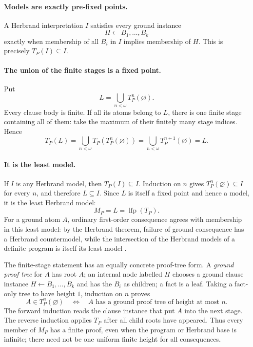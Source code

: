 \paragraph{Models are exactly pre-fixed points.}
A Herbrand interpretation \(I\) satisfies every ground instance
\[
 H\leftarrow B_1,\ldots,B_k
\]
exactly when membership of all \(B_i\) in \(I\) implies membership of \(H\).
This is precisely \(T_P(I)\subseteq I\).

\paragraph{The union of the finite stages is a fixed point.}
Put
\[
 L=\bigcup_{n<\omega}T_P^n(\varnothing).
\]
Every clause body is finite.  If all its atoms belong to \(L\), there is one
finite stage containing all of them: take the maximum of their finitely many
stage indices.  Hence
\[
 T_P(L)
 =\bigcup_{n<\omega}T_P(T_P^n(\varnothing))
 =\bigcup_{n<\omega}T_P^{n+1}(\varnothing)
 =L.
\]

\paragraph{It is the least model.}
If \(I\) is any Herbrand model, then \(T_P(I)\subseteq I\).  Induction on \(n\)
gives \(T_P^n(\varnothing)\subseteq I\) for every \(n\), and therefore
\(L\subseteq I\).  Since \(L\) is itself a fixed point and hence a model, it is
the least Herbrand model:
\[
 M_P=L=\operatorname{lfp}(T_P).
\]
For a ground atom \(A\), ordinary first-order consequence agrees with
membership in this least model: by the Herbrand theorem, failure of ground
consequence has a Herbrand countermodel, while the intersection of the
Herbrand models of a definite program is itself its least model
\cite[printed pp.~736--741]{VanEmdenKowalski1976}.

The finite-stage statement has an equally concrete proof-tree form.  A
\emph{ground proof tree} for \(A\) has root \(A\); an internal node labelled
\(H\) chooses a ground clause instance
\(H\leftarrow B_1,\ldots,B_k\) and has the \(B_i\) as children; a fact is a
leaf.  Taking a fact-only tree to have height \(1\), induction on \(n\) proves
\[
 A\in T_P^n(\varnothing)
 \quad\Longleftrightarrow\quad
 A\text{ has a ground proof tree of height at most }n.
\]
The forward induction reads the clause instance that put \(A\) into the next
stage.  The reverse induction applies \(T_P\) after all child roots have
appeared.  Thus every member of \(M_P\) has a finite proof, even when the
program or Herbrand base is infinite; there need not be one uniform finite
height for all consequences.

